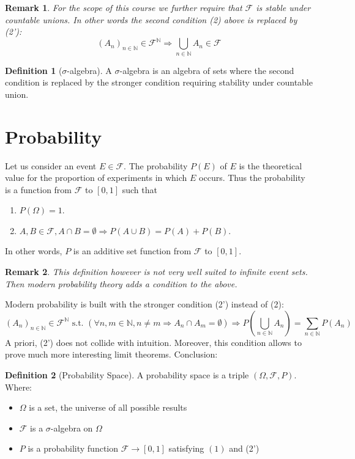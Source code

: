 \documentclass[10pt,a4paper]{book}
\newtheorem*{remark}{Remark}
\theoremstyle{definition}
\newtheorem{definition}{Definition}[section]
\begin{document}
\begin{remark}
For the scope of this course we further require that $\mathcal{F}$ is stable under countable unions. In other words the second condition (2) above is replaced by (2'):
\[
(A_n)_{n \in \mathbb{N}} \in \mathcal{F}^\mathbb{N} \Rightarrow \bigcup_{n \in \mathbb{N}} A_n \in \mathcal{F}
\]
\end{remark}

\begin{definition}[$\sigma$-algebra]
A $\sigma$-algebra is an algebra of sets where the second condition is replaced by the stronger condition requiring stability under countable union.
\end{definition}
\section{Probability}
Let us consider an event $E\in\mathcal{F}$. The probability $P(E)$ of $E$ is the theoretical value for the proportion of experiments in which $E$ occurs. Thus the probability is a function from $\mathcal{F}$ to $[0,1]$ such that 
\begin{enumerate}
\item $P(\Omega) = 1$.
\item $A, B \in \mathcal{F}, A \cap B = \emptyset \Rightarrow P(A \cup B) = P(A) + P(B)$.
\end{enumerate}
In other words, $P$ is an additive set function from $\mathcal{F}$ to $[0,1]$. 

\begin{remark}
This definition however is not very well suited to infinite event sets. Then modern probability theory adds a condition to the above.
\end{remark}
Modern probability is built with the stronger condition (2') instead of (2):
\[
(A_n)_{n \in \mathbb{N}} \in \mathcal{F}^\mathbb{N}\,\,\text{s.t.}\,\, \left(\forall n, m \in \mathbb{N}, n \neq m \Rightarrow A_n \cap A_m = \emptyset\right) \Rightarrow P\left(\bigcup_{n \in \mathbb{N}} A_n \right) = \sum_{n \in \mathbb{N}} P(A_n)
\]
A priori, (2') does not collide with intuition. Moreover, this condition allows to prove much more interesting limit theorems. Conclusion:

\begin{definition}[Probability Space]
A probability space is a triple $(\Omega, \mathcal{F}, P)$. Where:
\begin{itemize}
\item $\Omega$ is a set, the universe of all possible results
\item $\mathcal{F}$ is a $\sigma$-algebra on $\Omega$
\item $P$ is a probability function $\mathcal{F}\to[0,1]$ satisfying $(1)$ and (2')
\end{itemize}
\end{definition}
\end{document}
